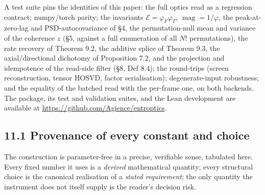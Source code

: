 \documentclass[10pt,letterpaper,twocolumn]{article}
\begin{document}
A test suite pins the identities of this paper: the full optics read as a regression contract; numpy/torch parity; the invariants \(\mathcal E=\varphi_F\varphi_T\), \(\operatorname{mag}=1/\varphi\), the peak-at-zero-lag and PSD-autocovariance of §4, the permutation-null mean and variance of the coherence \(z\) (§5, against a full enumeration of all \(N!\) permutations), the rate recovery of Theorem 9.2, the additive splice of Theorem 9.3, the axial/directional dichotomy of Proposition 7.2, and the projection and idempotence of the read-side filter (§8, Def 8.4); the round-trips (screen reconstruction, tensor HOSVD, factor serialisation); degenerate-input robustness; and the equality of the batched read with the per-frame one, on both backends. The package, its test and validation suites, and the Lean development are available at \href{https://github.com/Agience/entroptics}{https:\allowbreak{}/\allowbreak{}/\allowbreak{}github.\allowbreak{}com/\allowbreak{}Agience/\allowbreak{}entropti\allowbreak{}cs}.

\subsection{11.1 Provenance of every constant and choice}\label{111-provenance-of-every-constant-and-choice}

The construction is parameter-free in a precise, verifiable sense, tabulated here. Every fixed number it uses is a \emph{derived} mathematical quantity; every structural choice is the canonical realisation of a \emph{stated requirement}; the only quantity the instrument does not itself supply is the reader's decision risk.
\end{document}
